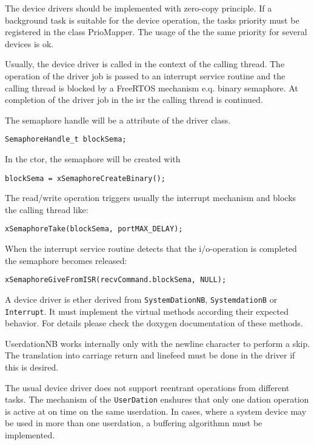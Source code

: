 The device drivers should be implemented with zero-copy principle.
If a background task is suitable for the device operation, the 
tasks priority must be registered in the class PrioMapper. The usage
of the the same priority for several devices is ok.

Usually, the device driver is called in the context of the calling thread.
The operation of the driver job is passed to an interrupt service routine and
the calling thread is blocked by a FreeRTOS mechanism e.q. binary semaphore.
At completion of the driver job in the isr the calling thread is continued.

The semaphore handle will be a attribute of the driver class.
\begin{verbatim}
SemaphoreHandle_t blockSema;
\end{verbatim}

 In the ctor,
the semaphore will be created with 
\begin{verbatim}
blockSema = xSemaphoreCreateBinary();
\end{verbatim}

The read/write operation triggers usually the interrupt mechanism and blocks
the calling thread like:
\begin{verbatim}
xSemaphoreTake(blockSema, portMAX_DELAY);
\end{verbatim}


When the interrupt service routine detects that the i/o-operation is completed
the semaphore becomes released:
\begin{verbatim}
xSemaphoreGiveFromISR(recvCommand.blockSema, NULL);
\end{verbatim}

A device driver is ether derived from \verb|SystemDationNB|,
 \verb|SystemdationB| or \verb|Interrupt|.
It must implement the virtual methods according their
expected behavior. For details please check the doxygen documentation
of these methods.

UserdationNB works internally only with the newline character to 
perform a skip. The translation into carriage return and linefeed must
be done in the driver if this is desired.

The usual device driver does not support reentrant operations from
different tasks. 
The mechanism of the \verb|UserDation| enshures that only one dation
operation is active at on time on the same userdation. In cases, where
a system device may be used in more than one userdation, a buffering
algorithmn must be implemented. 

